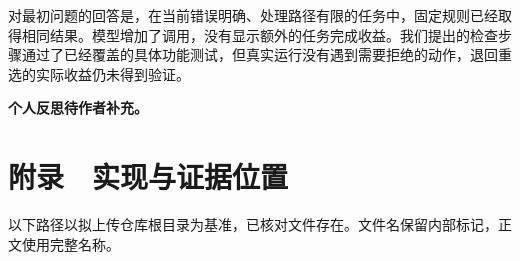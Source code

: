 \documentclass[12pt,a4paper,UTF8,fontset=none]{ctexart}
\begin{document}
对最初问题的回答是，在当前错误明确、处理路径有限的任务中，固定规则已经取得相同结果。模型增加了调用，没有显示额外的任务完成收益。我们提出的检查步骤通过了已经覆盖的具体功能测试，但真实运行没有遇到需要拒绝的动作，退回重选的实际收益仍未得到验证。


\textbf{个人反思待作者补充。}


\clearpage\section*{附录　实现与证据位置}

以下路径以拟上传仓库根目录为基准，已核对文件存在。文件名保留内部标记，正文使用完整名称。


\begingroup
\footnotesize
\setlength{\tabcolsep}{4pt}
\renewcommand{\arraystretch}{1.25}
\end{document}
